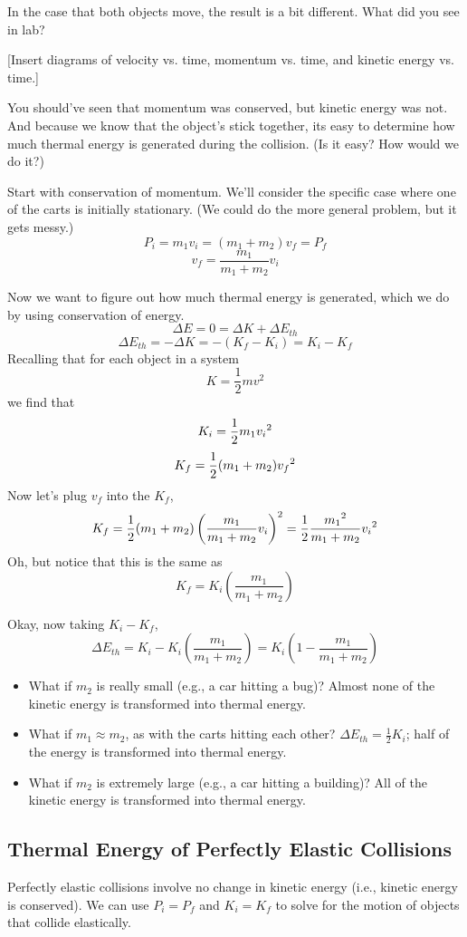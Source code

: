 In the case that both objects move, the result is a bit different. What did you see in lab?

[Insert diagrams of velocity vs. time, momentum vs. time, and kinetic energy vs. time.]
\vspace{5cm}

You should've seen that momentum was conserved, but kinetic energy was not. And because we know that the object's stick together, its easy to determine how much thermal energy is generated during the collision. (Is it easy? How would we do it?)

Start with conservation of momentum. We'll consider the specific case where one of the carts is initially stationary. (We could do the more general problem, but it gets messy.)
$$P_i=m_1v_i=(m_1+m_2)v_f=P_f$$
$$v_f=\frac{m_1}{m_1+m_2}v_i$$

Now we want to figure out how much thermal energy is generated, which we do by using conservation of energy.
$$\Delta{E}=0=\Delta{K}+\Delta{E_{th}}$$
$$\Delta{E_{th}}=-\Delta{K}=-(K_f-K_i)=K_i-K_f$$
Recalling that for each object in a system
$$K=\frac{1}{2}mv^2$$
we find that 
$$K_i=\frac{1}{2}m_1v_i\displaystyle^2$$
$$K_f=\frac{1}{2}(m_1+m_2)v_f\displaystyle^2$$
Now let's plug $v_f$ into the $K_f$,
$$K_f=\frac{1}{2}(m_1+m_2)\left(\frac{m_1}{m_1+m_2}v_i\right)^2=\frac{1}{2}\frac{m_1\displaystyle^2}{m_1+m_2}v_i\displaystyle^2$$
Oh, but notice that this is the same as
$$K_f=K_i\left(\frac{m_1}{m_1+m_2}\right)$$

Okay, now taking $K_i-K_f$,
$$\Delta{E_{th}}=K_i-K_i\left(\frac{m_1}{m_1+m_2}\right)=\boxed{K_i\left(1-\frac{m_1}{m_1+m_2}\right)}$$

\begin{itemize}
\item What if $m_2$ is really small (e.g., a car hitting a bug)? Almost none of the kinetic energy is transformed into thermal energy.
\item What if $m_1\approx m_2$, as with the carts hitting each other? $\Delta E_{th}=\frac{1}{2}K_i$; half of the energy is transformed into thermal energy.
\item What if $m_2$ is extremely large (e.g., a car hitting a building)? All of the kinetic energy is transformed into thermal energy.
\end{itemize}



\subsection{Thermal Energy of Perfectly Elastic Collisions}
Perfectly elastic collisions involve no change in kinetic energy (i.e., kinetic energy is conserved). We can use $P_i=P_f$ and $K_i=K_f$ to solve for the motion of objects that collide elastically.

